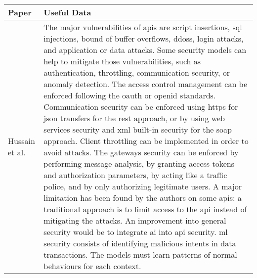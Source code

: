\begin{small}
\begin{landscape}
	\begin{tabularx}{\linewidth}{p{1.5cm}|X}
		\toprule[0.8mm]
		\textbf{Paper} & \textbf{Useful Data} \\
		\midrule[0.8mm]
		Hussain et al. \cite{hussain_enterprise_2020} & The major vulnerabilities of \glspl{api} are script insertions, \gls{sql} injections, bound of buffer overflows, \glspl{ddos}, login attacks, and application or data attacks. Some security models can help to mitigate those vulnerabilities, such as authentication, throttling, communication security, or anomaly detection. The access control management can be enforced following the \gls{oauth} or \gls{openid} standards. Communication security can be enforced using \gls{https} for \gls{json} transfers for the \gls{rest} approach, or by using web services security and \gls{xml} built-in security for the \gls{soap} approach. Client throttling can be implemented in order to avoid attacks. The gateways security can be enforced by performing message analysis, by granting access tokens and authorization parameters, by acting like a traffic police, and by only authorizing legitimate users. A major limitation has been found by the authors on some \glspl{api}: a traditional approach is to limit access to the \gls{api} instead of mitigating the attacks. An improvement into general security would be to integrate \gls{ai} into \gls{api} security. \gls{ml} security consists of identifying malicious intents in data transactions. The models must learn patterns of normal behaviours for each context. \\
		\midrule

\end{tabularx}
\end{landscape}
\end{small}
